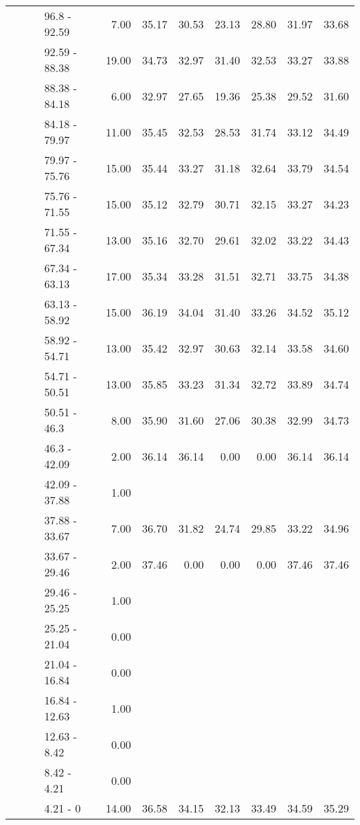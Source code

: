 \begin{longtable}{llllrrrrrrr}
   &  &  & 96.8 - 92.59 & 7.00 & 35.17 & 30.53 & 23.13 & 28.80 & 31.97 & 33.68 \\ 
   &  &  & 92.59 - 88.38 & 19.00 & 34.73 & 32.97 & 31.40 & 32.53 & 33.27 & 33.88 \\ 
   &  &  & 88.38 - 84.18 & 6.00 & 32.97 & 27.65 & 19.36 & 25.38 & 29.52 & 31.60 \\ 
   &  &  & 84.18 - 79.97 & 11.00 & 35.45 & 32.53 & 28.53 & 31.74 & 33.12 & 34.49 \\ 
   &  &  & 79.97 - 75.76 & 15.00 & 35.44 & 33.27 & 31.18 & 32.64 & 33.79 & 34.54 \\ 
   &  &  & 75.76 - 71.55 & 15.00 & 35.12 & 32.79 & 30.71 & 32.15 & 33.27 & 34.23 \\ 
   &  &  & 71.55 - 67.34 & 13.00 & 35.16 & 32.70 & 29.61 & 32.02 & 33.22 & 34.43 \\ 
   &  &  & 67.34 - 63.13 & 17.00 & 35.34 & 33.28 & 31.51 & 32.71 & 33.75 & 34.38 \\ 
   &  &  & 63.13 - 58.92 & 15.00 & 36.19 & 34.04 & 31.40 & 33.26 & 34.52 & 35.12 \\ 
   &  &  & 58.92 - 54.71 & 13.00 & 35.42 & 32.97 & 30.63 & 32.14 & 33.58 & 34.60 \\ 
   &  &  & 54.71 - 50.51 & 13.00 & 35.85 & 33.23 & 31.34 & 32.72 & 33.89 & 34.74 \\ 
   &  &  & 50.51 - 46.3 & 8.00 & 35.90 & 31.60 & 27.06 & 30.38 & 32.99 & 34.73 \\ 
   &  &  & 46.3 - 42.09 & 2.00 & 36.14 & 36.14 & 0.00 & 0.00 & 36.14 & 36.14 \\ 
   &  &  & 42.09 - 37.88 & 1.00 &  &  &  &  &  &  \\ 
   &  &  & 37.88 - 33.67 & 7.00 & 36.70 & 31.82 & 24.74 & 29.85 & 33.22 & 34.96 \\ 
   &  &  & 33.67 - 29.46 & 2.00 & 37.46 & 0.00 & 0.00 & 0.00 & 37.46 & 37.46 \\ 
   &  &  & 29.46 - 25.25 & 1.00 &  &  &  &  &  &  \\ 
   &  &  & 25.25 - 21.04 & 0.00 &  &  &  &  &  &  \\ 
   &  &  & 21.04 - 16.84 & 0.00 &  &  &  &  &  &  \\ 
   &  &  & 16.84 - 12.63 & 1.00 &  &  &  &  &  &  \\ 
   &  &  & 12.63 - 8.42 & 0.00 &  &  &  &  &  &  \\ 
   &  &  & 8.42 - 4.21 & 0.00 &  &  &  &  &  &  \\ 
   &  &  & 4.21 - 0 & 14.00 & 36.58 & 34.15 & 32.13 & 33.49 & 34.59 & 35.29 \\ 

\end{longtable}

